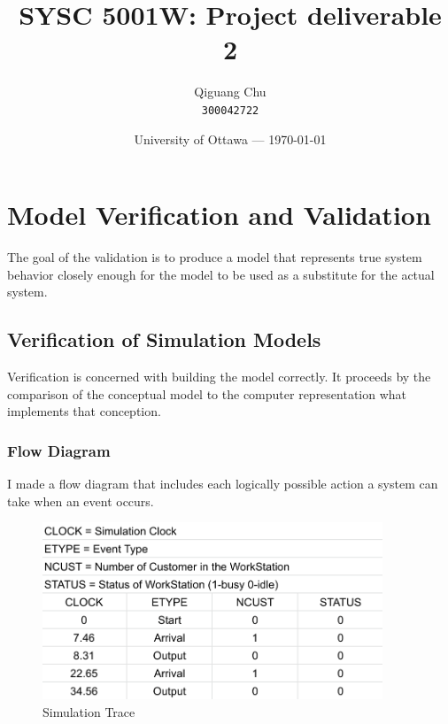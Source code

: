 \documentclass{article}
\title{SYSC 5001W: Project deliverable 2} %
\author{Qiguang Chu\\ \texttt{300042722}} %
\date{University of Ottawa --- \today} %
\begin{document}
\maketitle

\section{Model Verification and Validation}

The goal of the validation is to produce a model that represents true system behavior closely enough for the model
to be used as a substitute for the actual system. 

\subsection{Verification of Simulation Models}

Verification is concerned with building the model correctly. It proceeds by the comparison of the conceptual model to the computer representation what implements that conception.

\subsubsection{Flow Diagram}
I made a flow diagram that includes each logically possible action a system can take when an event occurs.

\begin{figure}[htbp]
\begin{center}
\includegraphics[width=4in]{Simulationtrace.png}
\caption{Simulation Trace}
\label{default}
\end{center}
\end{figure}
\end{document}
